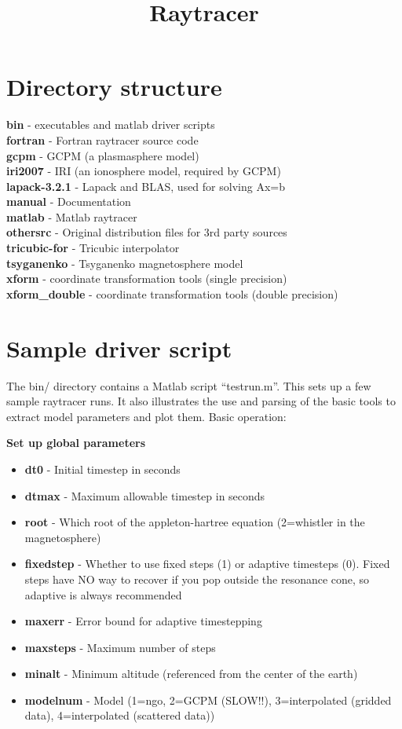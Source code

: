 \documentclass[10pt]{article}
\begin{document}
\title{Raytracer}
\section{Directory structure}
{\bf bin} - executables and matlab driver scripts \\
{\bf fortran} - Fortran raytracer source code \\
{\bf gcpm} - GCPM (a plasmasphere model) \\
{\bf iri2007} - IRI (an ionosphere model, required by GCPM) \\
{\bf lapack-3.2.1} - Lapack and BLAS, used for solving Ax=b \\
{\bf manual} - Documentation \\
{\bf matlab} - Matlab raytracer \\
{\bf othersrc} - Original distribution files for 3rd party sources \\
{\bf tricubic-for} - Tricubic interpolator \\
{\bf tsyganenko} - Tsyganenko magnetosphere model \\
{\bf xform} - coordinate transformation tools (single precision) \\
{\bf xform\_double} - coordinate transformation tools (double
precision) \\

\section{Sample driver script}
The bin/ directory contains a Matlab script ``testrun.m''.  This sets
up a few sample raytracer runs.  It also illustrates the use and
parsing of the basic tools to extract model parameters and plot them.
Basic operation:

{\bf Set up global parameters}
\begin{itemize}
\item {\bf dt0} - Initial timestep in seconds
\item {\bf dtmax} - Maximum allowable timestep in seconds
\item {\bf root} - Which root of the appleton-hartree equation
  (2=whistler in the magnetosphere)
\item {\bf fixedstep} - 
  Whether to use fixed steps (1) or adaptive timesteps (0).
  Fixed steps have NO way to recover if you pop outside the resonance
  cone, so adaptive is always recommended
\item {\bf maxerr} - Error bound for adaptive timestepping
\item {\bf maxsteps} - Maximum number of steps
\item {\bf minalt} - Minimum altitude (referenced from the center of
  the earth)
\item {\bf modelnum} - Model (1=ngo, 2=GCPM (SLOW!!), 3=interpolated
  (gridded data),
  4=interpolated (scattered data))
\end{itemize}
\end{document}
